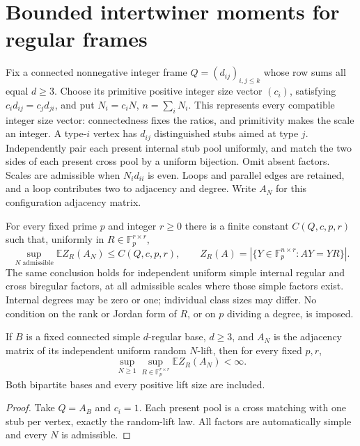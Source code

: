 \section{Bounded intertwiner moments for regular frames}\label{sec:frame-moment-proof}

Fix a connected nonnegative integer frame $Q=(d_{ij})_{i,j\le k}$
whose row sums all equal $d\ge3$. Choose its primitive positive
integer size vector $(c_i)$, satisfying $c_id_{ij}=c_jd_{ji}$, and put
$N_i=c_iN$, $n=\sum_iN_i$. This represents every compatible integer
size vector: connectedness fixes the ratios, and primitivity makes the
scale an integer. A type-$i$ vertex has $d_{ij}$ distinguished stubs
aimed at type $j$. Independently pair each present internal stub pool
uniformly, and match the two sides of each present cross pool by a
uniform bijection. Omit absent factors. Scales are admissible when
$N_id_{ii}$ is even. Loops and parallel edges are retained, and a loop
contributes two to adjacency and degree. Write $A_N$ for this
configuration adjacency matrix.

\begin{theorem}\label{thm:frame-bounded-moment}
For every fixed prime $p$ and integer $r\ge0$ there is a finite constant
$C(Q,c,p,r)$ such that, uniformly in $R\in\mathbb F_p^{r\times r}$,
\[
 \sup_{N\text{ admissible}}\mathbb E Z_R(A_N)\le C(Q,c,p,r),
 \qquad
 Z_R(A)=|\{Y\in\mathbb F_p^{n\times r}:AY=YR\}|.
\]
The same conclusion holds for independent uniform simple internal
regular and cross biregular factors, at all admissible scales where
those simple factors exist. Internal degrees may be zero or one;
individual class sizes may differ. No condition on the rank or Jordan
form of $R$, or on $p$ dividing a degree, is imposed.
\end{theorem}

\begin{corollary}\label{thm:lift-bounded-moment}
If $B$ is a fixed connected simple $d$-regular base, $d\ge3$, and
$A_N$ is the adjacency matrix of its independent uniform random
$N$-lift, then for every fixed $p,r$,
\[
 \sup_{N\ge1}\sup_{R\in\mathbb F_p^{r\times r}}
                  \mathbb E Z_R(A_N)<\infty.
\]
Both bipartite bases and every positive lift size are included.
\end{corollary}
\begin{proof}
Take $Q=A_B$ and $c_i=1$. Each present pool is a cross matching with
one stub per vertex, exactly the random-lift law. All factors are
automatically simple and every $N$ is admissible.
\end{proof}

